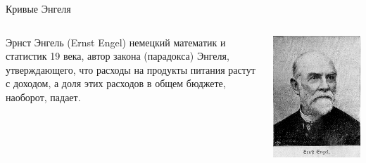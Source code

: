 \documentclass{beamer}
\begin{document}
\begin{frame}{Кривые Энгеля}

\begin{columns}
\begin{column}{0.5\textwidth}
   \alert{Эрнст Энгель} (Ernst Engel) немецкий математик и статистик 19 века, автор \alert{закона (парадокса) Энгеля}, утверждающего, что расходы на продукты питания растут с доходом, а доля этих расходов в общем бюджете, наоборот, падает. 
\end{column}
\begin{column}{0.5\textwidth}  %
    \begin{center}
     \includegraphics[width=1\textwidth]{engel.jpeg}
     \end{center}
\end{column}
\end{columns}

\end{frame}
\end{document}
